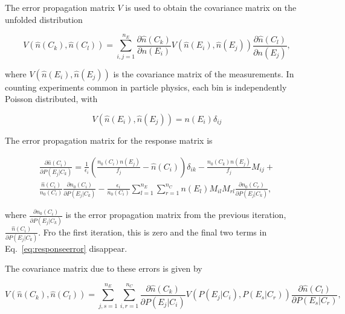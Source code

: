  \noindent The error propagation matrix $V$ is used to obtain the covariance matrix on the unfolded distribution 
 
 \begin{equation}
 V\left(\hat n\left(C_k\right), \hat n\left(C_l\right)\right) = \sum_{i,j=1}^{n_E} \frac{\partial \hat n\left(C_k\right) }{\partial n\left(E_i\right) }  V\left(\hat n\left(E_i\right), \hat n\left(E_j\right)\right)  \frac{\partial \hat n\left(C_l\right) }{\partial n\left(E_j\right) },
 \end{equation}
 
\noindent where $V\left(\hat n\left(E_i\right), \hat n\left(E_j\right)\right)$ is the covariance matrix of the measurements. In counting experiments common in particle physics, each bin is independently Poisson distributed, with
 
 \begin{equation}
 V\left(\hat n\left(E_i\right), \hat n\left(E_j\right)\right) = n\left(E_i\right) \delta_{ij}
 \end{equation}
 
 \noindent The error propagation matrix for the response matrix is 
 
 \begin{multline}
 \frac{\partial \hat n\left(C_i\right)}{\partial P \left(E_j| C_k\right)} = \frac{1}{\epsilon_i}\left(\frac{n_0 \left(C_i\right) n\left(E_j\right)}{f_j} - \hat n \left(C_i\right) \right) \delta_{ik} - \frac{n_0 \left(C_k\right) n\left(E_j\right)}{f_j} M_{ij} + \\
  \frac{\hat n\left(C_i\right)}{n_0\left(C_i\right)} \frac{\partial n_0\left(C_i\right)}{\partial P \left(E_j| C_k\right)} - \frac{\epsilon_i}{n_0\left(C_i\right)} \sum_{l=1}^{n_E}\sum_{r=1}^{n_C} n\left(E_l\right) M_{il} M_{rl} \frac{\partial n_0 \left(C_r \right)}{\partial P \left(E_j| C_k\right)},
 \label{eq:responseerror}
 \end{multline}
 
 where $ \frac{\partial n_0\left(C_i\right)}{\partial P \left(E_j| C_k\right)}$ is the error propagation matrix from the previous iteration, $\frac{\hat n\left(C_i\right)}{\partial P \left(E_j| C_k\right)}$. Fro the first iteration, this is zero and the final two terms in Eq.~\ref{eq:responseerror} disappear.
 
 The covariance matrix due to these errors is given by
 
 \begin{equation}
 V\left(\hat n\left(C_k\right), \hat n\left(C_l\right)\right) = \sum_{j,s=1}^{n_E} \sum_{i,r=1}^{n_C} \frac{\partial \hat n\left(C_k\right) }{\partial P\left(E_j | C_i\right) }  V\left(P\left(E_j | C_i\right), P\left(E_s | C_r\right) \right)  \frac{\partial \hat n\left(C_l\right) }{\partial P\left(E_s | C_r\right) },
 \end{equation}
 
